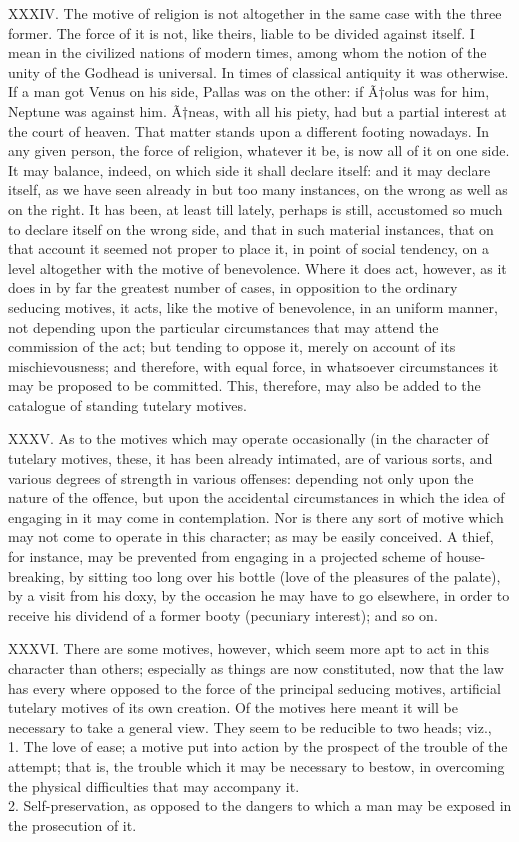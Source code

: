 \documentclass[12pt]{report}
\begin{document}
XXXIV. The motive of religion is not altogether in the same case with
the three former. The force of it is not, like theirs, liable to be
divided against itself. I mean in the civilized nations of modern times,
among whom the notion of the unity of the Godhead is universal. In times
of classical antiquity it was otherwise. If a man got Venus on his side,
Pallas was on the other: if Ã†olus was for him, Neptune was against him.
Ã†neas, with all his piety, had but a partial interest at the court of
heaven. That matter stands upon a different footing nowadays. In any
given person, the force of religion, whatever it be, is now all of it on
one side. It may balance, indeed, on which side it shall declare itself:
and it may declare itself, as we have seen already in but too many
instances, on the wrong as well as on the right. It has been, at least
till lately, perhaps is still, accustomed so much to declare itself on
the wrong side, and that in such material instances, that on that
account it seemed not proper to place it, in point of social tendency,
on a level altogether with the motive of benevolence. Where it does act,
however, as it does in by far the greatest number of cases, in
opposition to the ordinary seducing motives, it acts, like the motive of
benevolence, in an uniform manner, not depending upon the particular
circumstances that may attend the commission of the act; but tending to
oppose it, merely on account of its mischievousness; and therefore, with
equal force, in whatsoever circumstances it may be proposed to be
committed. This, therefore, may also be added to the catalogue of
standing tutelary motives.

XXXV. As to the motives which may operate occasionally (in the character
of tutelary motives, these, it has been already intimated, are of
various sorts, and various degrees of strength in various offenses:
depending not only upon the nature of the offence, but upon the
accidental circumstances in which the idea of engaging in it may come in
contemplation. Nor is there any sort of motive which may not come to
operate in this character; as may be easily conceived. A thief, for
instance, may be prevented from engaging in a projected scheme of
house-breaking, by sitting too long over his bottle (love of the
pleasures of the palate), by a visit from his doxy, by the occasion he
may have to go elsewhere, in order to receive his dividend of a former
booty (pecuniary interest); and so on.

XXXVI. There are some motives, however, which seem more apt to act in
this character than others; especially as things are now constituted,
now that the law has every where opposed to the force of the principal
seducing motives, artificial tutelary motives of its own creation. Of
the motives here meant it will be necessary to take a general view. They
seem to be reducible to two heads; viz.,\\
1. The love of ease; a motive put into action by the prospect of the
trouble of the attempt; that is, the trouble which it may be necessary
to bestow, in overcoming the physical difficulties that may accompany
it.\\
2. Self-preservation, as opposed to the dangers to which a man may be
exposed in the prosecution of it.
\end{document}
